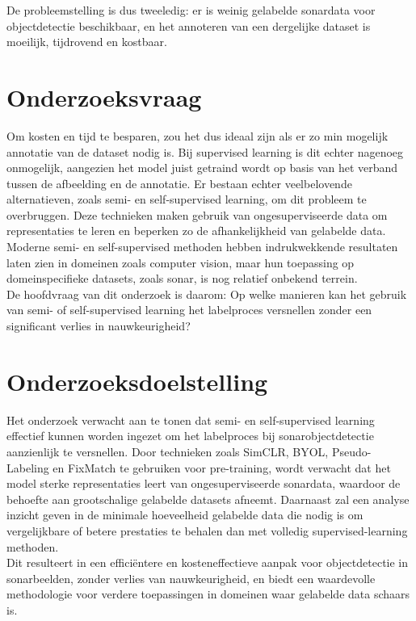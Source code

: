 De probleemstelling is dus tweeledig: er is weinig gelabelde sonardata voor objectdetectie beschikbaar, en het annoteren van een dergelijke dataset is moeilijk, tijdrovend en kostbaar.

\section{Onderzoeksvraag}%
\label{sec:onderzoeksvraag}

Om kosten en tijd te besparen, zou het dus ideaal zijn als er zo min mogelijk annotatie van de dataset nodig is. Bij supervised learning is dit echter nagenoeg onmogelijk, aangezien het model juist getraind wordt op basis van het verband tussen de afbeelding en de annotatie. Er bestaan echter veelbelovende alternatieven, zoals semi- en self-supervised learning, om dit probleem te overbruggen. Deze technieken maken gebruik van ongesuperviseerde data om representaties te leren en beperken zo de afhankelijkheid van gelabelde data. Moderne semi- en self-supervised methoden hebben indrukwekkende resultaten laten zien in domeinen zoals computer vision, maar hun toepassing op domeinspecifieke datasets, zoals sonar, is nog relatief onbekend terrein. \\

De hoofdvraag van dit onderzoek is daarom: Op welke manieren kan het gebruik van semi- of self-supervised learning het labelproces versnellen zonder een significant verlies in nauwkeurigheid?

\section{Onderzoeksdoelstelling}%
\label{sec:onderzoeksdoelstelling}

Het onderzoek verwacht aan te tonen dat semi- en self-supervised learning effectief kunnen worden ingezet om het labelproces bij sonarobjectdetectie aanzienlijk te versnellen. Door technieken zoals SimCLR, BYOL, Pseudo-Labeling en FixMatch te gebruiken voor pre-training, wordt verwacht dat het model sterke representaties leert van ongesuperviseerde sonardata, waardoor de behoefte aan grootschalige gelabelde datasets afneemt. Daarnaast zal een analyse inzicht geven in de minimale hoeveelheid gelabelde data die nodig is om vergelijkbare of betere prestaties te behalen dan met volledig supervised-learning methoden. \\

Dit resulteert in een efficiëntere en kosteneffectieve aanpak voor objectdetectie in sonarbeelden, zonder verlies van nauwkeurigheid, en biedt een waardevolle methodologie voor verdere toepassingen in domeinen waar gelabelde data schaars is.


